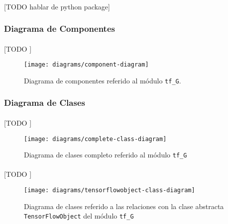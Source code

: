 \documentclass{subfiles}
\begin{document}
        \paragraph{}
        [TODO hablar de python package]

        \subsubsection{Diagrama de Componentes}
        \label{sec:component_diagram}

          \paragraph{}
          [TODO ]

          \begin{figure}[h]
            \centering
            \texttt{[image: diagrams/component-diagram]}
            \caption{Diagrama de componentes referido al módulo \texttt{tf\_G}.}
            \label{img:component_diagram}
          \end{figure}


        \subsubsection{Diagrama de Clases}
        \label{sec:class_diagram}

          \paragraph{}
          [TODO ]

          \begin{figure}[h]
            \centering
            \texttt{[image: diagrams/complete-class-diagram]}
            \caption{Diagrama de clases completo referido al módulo \texttt{tf\_G}}
            \label{img:class_diagram}
          \end{figure}

          \paragraph{}
          [TODO ]

          \begin{figure}[h]
            \centering
            \texttt{[image: diagrams/tensorflowobject-class-diagram]}
            \caption{Diagrama de clases referido a las relaciones con la clase abstracta \texttt{TensorFlowObject} del módulo \texttt{tf\_G}}
            \label{img:tensorflowobject_class_diagram}
          \end{figure}
\end{document}
